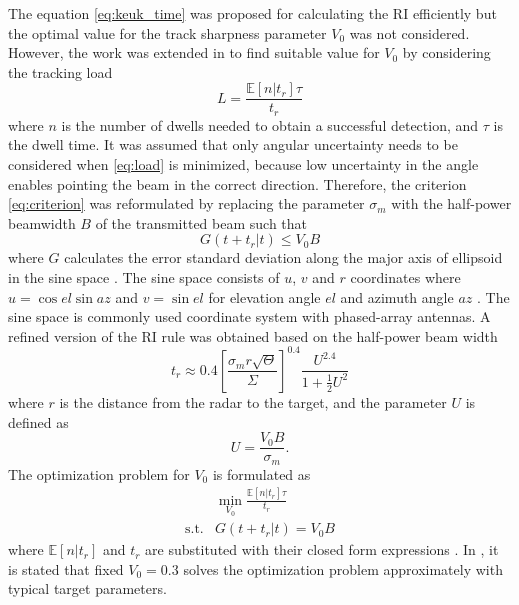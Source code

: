 \documentclass[english, 12pt, a4paper, elec, utf8, a-1b, online]{aaltothesis}
\newcommand{\E}[1]{\mathbb{E}\left[ #1 \right]}
\newcommand{\ri}{t_r}
\begin{document}
The equation \eqref{eq:keuk_time} was proposed for calculating the RI efficiently but the optimal value for the track sharpness parameter $V_0$ was not considered.
However, the work was extended in \cite{vanKeuk1993} to find suitable value for $V_0$ by considering the tracking load
\begin{equation}\label{eq:load}
    L = \frac{\E{n | \ri} \tau}{\ri}
\end{equation}
where $n$ is the number of dwells needed to obtain a successful detection, and $\tau$ is the dwell time.
It was assumed that only angular uncertainty needs to be considered when \eqref{eq:load} is minimized, 
because low uncertainty in the angle enables pointing the beam in the correct direction.
Therefore, the criterion \eqref{eq:criterion} was reformulated by replacing the parameter $\sigma_m$ with the half-power beamwidth $B$ of the transmitted beam such that
\begin{equation} \label{eq:criterion2}
    G(t + \ri | t) \leq V_0 B
\end{equation}
where $G$ calculates the error standard deviation along the major axis of ellipsoid in the sine space \cite{vanKeuk1993}.
The sine space consists of $u$, $v$ and $r$ coordinates where $u=\cos el \sin az$ and $v=\sin el$ for elevation angle $el$ and azimuth angle $az$ \cite{Mailloux2017}.
The sine space is commonly used coordinate system with phased-array antennas.
A refined version of the RI rule was obtained based on the half-power beam width
\begin{equation}\label{eq:van_keuk_revisited}
    \ri \approx 0.4 \left[ \frac{\sigma_m r \sqrt{\Theta}}{\Sigma} \right]^{0.4} \frac{U^{2.4}}{1+\frac{1}{2}U^2}
\end{equation}
where $r$ is the distance from the radar to the target, and the parameter $U$ is defined as
\begin{equation}
    U = \frac{V_0 B}{\sigma_m}.
\end{equation}
The optimization problem for $V_0$ is formulated as 
\begin{equation}
\begin{array}{ll}
     & \min_{V_0} \frac{\E{n | \ri} \tau}{\ri} \\ [7pt]
    \text{s.t.} & G(t + \ri | t) = V_0 B
\end{array}
\end{equation}
where $\E{n | \ri}$ and $\ri$ are substituted with their closed form expressions \cite{vanKeuk1993}.
In \cite{vanKeuk1993}, it is stated that fixed $V_0=0.3$ solves the optimization problem approximately with typical target parameters.
\end{document}
